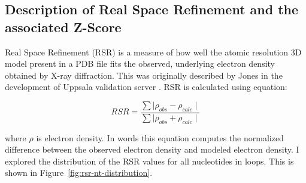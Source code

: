 \subsection{Description of Real Space Refinement and the associated Z-Score}

Real Space Refinement (RSR) is a measure of how well the atomic resolution 3D
model present in a PDB file fits the observed, underlying electron density
obtained by X-ray diffraction. This was originally described by Jones \etal{} in
the development of Uppsala validation server \cite{Kleywegt2004a}. RSR is
calculated using equation:

\begin{equation}
  RSR = \frac{\sum \mid \rho_{obs} - \rho_{calc} \mid}
             {\sum \mid \rho_{obs} + \rho_{calc} \mid}
\end{equation}

where $\rho$ is electron density. 
In words this equation computes the normalized
difference between the observed electron density and modeled electron density. I
explored the distribution of the RSR values for all nucleotides in loops. This
is shown in Figure~\ref{fig:rsr-nt-distribution}.

